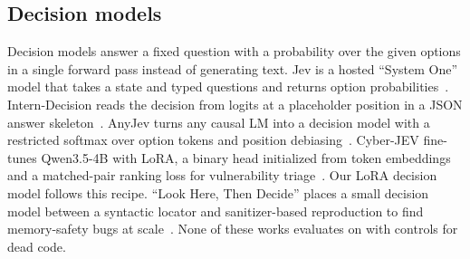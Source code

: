 \subsection{Decision models}
Decision models answer a fixed question with a probability over the given options in a single forward pass instead of generating text.
Jev is a hosted ``System One'' model that takes a state and typed questions and returns option probabilities~\cite{typesafe2026jev}.
Intern-Decision reads the decision from logits at a placeholder position in a JSON answer skeleton~\cite{zhu2026interndecision}.
AnyJev turns any causal LM into a decision model with a restricted softmax over option tokens and position debiasing~\cite{zhang2026anyjev}.
Cyber-JEV fine-tunes Qwen3.5-4B with LoRA, a binary head initialized from token embeddings and a matched-pair ranking loss for vulnerability triage~\cite{zhao2026cyberjev}.
Our LoRA decision model follows this recipe.
``Look Here, Then Decide'' places a small decision model between a syntactic locator and sanitizer-based reproduction to find memory-safety bugs at scale~\cite{dewachter2026lookhere}.
None of these works evaluates on \cwe{} with controls for dead code.
